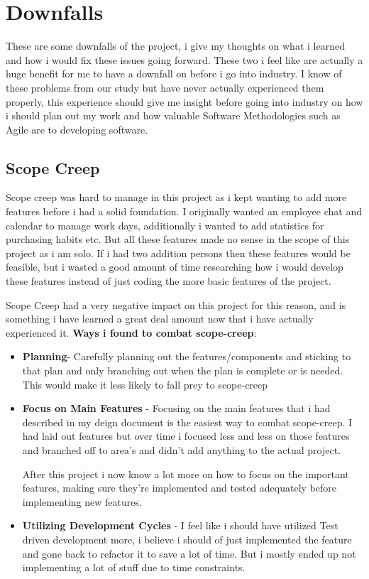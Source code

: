 \section{Downfalls}
These are some downfalls of the project, i give my thoughts on what i learned and how i would fix these issues going forward. These two i feel like are actually a huge benefit for me to have a downfall on before i go into industry. I know of these problems from our study but have never actually experienced them properly, this experience should give me insight before going into industry on how i should plan out my work and how valuable Software Methodologies such as Agile are to developing software.

\subsection{Scope Creep}
Scope creep was hard to manage in this project as i kept wanting to add more features before i had a solid foundation. I originally wanted an employee chat and calendar to manage work days, additionally i wanted to add statistics for purchasing habits etc. But all these features made no sense in the scope of this project as i am solo. If i had two addition persons then these features would be feasible, but i wasted a good amount of time researching how i would develop these features instead of just coding the more basic features of the project.

Scope Creep had a very negative impact on this project for this reason, and is something i have learned a great deal amount now that i have actually experienced it.\newline
\newpage
\textbf{Ways i found to combat scope-creep}:
\begin{itemize}
    \item \textbf{Planning}- Carefully planning out the features/components and sticking to that plan and only branching out when the plan is complete or is needed. This would make it less likely to fall prey to scope-creep
    \item \textbf{Focus on Main Features} - Focusing on the main features that i had described in my deign document is the easiest way to combat scope-creep. I had laid out features but over time i focused less and less on those features and branched off to area's and didn't add anything to the actual project.
    
    After this project i now know a lot more on how to focus on the important features, making sure they're implemented and tested adequately before implementing new features.
    \item \textbf{Utilizing Development Cycles} - I feel like i should have utilized Test driven development more, i believe i should of just implemented the feature and gone back to refactor it to save a lot of time. But i mostly ended up not implementing a lot of stuff due to time constraints.
\end{itemize}

